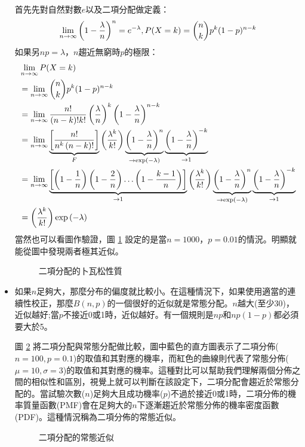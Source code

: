 \documentclass[12pt, a4paper]{article}
\begin{document}
\begin{itemize}
首先先對自然對數$e$以及二項分配做定義：
$$\lim_{n\to\infty}\left(1-{\lambda \over n}\right)^n=e^{-\lambda},{\displaystyle P(X=k)={n \choose k}p^{k}(1-p)^{n-k}}$$
如果另$np = \lambda $，$n$趨近無窮時$p$的極限：
\begin{align*}
&\lim_{n\to\infty} P(X=k)\\
&=\lim_{n\to\infty}{n \choose k} p^k (1-p)^{n-k} \\
 &=\lim_{n\to\infty}{n! \over (n-k)!k!} \left({\lambda \over n}\right)^k \left(1-{\lambda\over n}\right)^{n-k}\\
&=\lim_{n\to\infty}
\underbrace{\left[\frac{n!}{n^k\left(n-k\right)!}\right]}_F
\left(\frac{\lambda^k}{k!}\right)
\underbrace{\left(1-\frac{\lambda}{n}\right)^n}_{\to\exp\left(-\lambda\right)}
\underbrace{\left(1-\frac{\lambda}{n}\right)^{-k}}_{\to 1} \\
&= \lim_{n\to\infty}
\underbrace{\left[ \left(1-\frac{1}{n}\right)\left(1-\frac{2}{n}\right) \ldots \left(1-\frac{k-1}{n}\right)  \right]}_{\to 1}
\left(\frac{\lambda^k}{k!}\right)
\underbrace{\left(1-\frac{\lambda}{n}\right)^n}_{\to\exp\left(-\lambda\right)}
\underbrace{\left(1-\frac{\lambda}{n}\right)^{-k}}_{\to 1}      \\
&= \left(\frac{\lambda^k}{k!}\right)\exp\left(-\lambda\right)
\end{align*}
當然也可以看圖作驗證，圖 \ref{fig:binomial_poisson} 設定的是當$n=1000$，$p=0.01$的情況。明顯就能從圖中發現兩者極其近似。
\begin{figure}[h]
    \caption{二項分配的卜瓦松性質}
    \label{fig:binomial_poisson}
\end{figure}

\item 如果$n$足夠大，那麼分布的偏度就比較小。在這種情況下，如果使用適當的連續性校正，那麼$B(n,p)$的一個很好的近似就是常態分配。$n$越大(至少30)，近似越好;當$p$不接近0或1時，近似越好。有一個規則是$np$和$np(1-p)$都必須要大於5。

圖 \ref{fig:binomial_normal} 將二項分配與常態分配做比較，圖中藍色的直方圖表示了二項分佈($n=100,p=0.1$)的取值和其對應的機率，而紅色的曲線則代表了常態分佈($\mu=10,\sigma=3$)的取值和其對應的機率。這種對比可以幫助我們理解兩個分佈之間的相似性和區別，視覺上就可以判斷在該設定下，二項分配會趨近於常態分配的。當試驗次數($n$)足夠大且成功機率($p$)不過於接近0或1時，二項分佈的機率質量函數(PMF)會在足夠大的$n$下逐漸趨近於常態分佈的機率密度函數(PDF)。這種情況稱為二項分佈的常態近似。
\begin{figure}[h]
    \caption{二項分配的常態近似}
    \label{fig:binomial_normal}
\end{figure}
\end{itemize}
\end{document}

